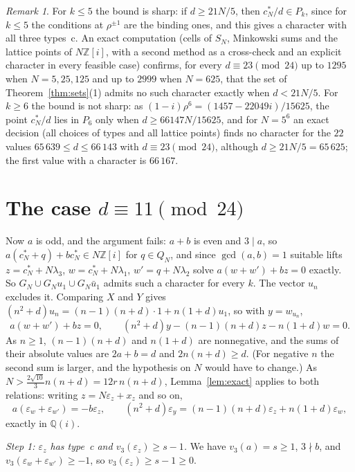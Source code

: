 \documentclass[11pt,a4paper]{amsart}
\theoremstyle{remark}
\newtheorem*{remark}{Remark}
\newcommand{\Q}{\mathbb{Q}}
\newcommand{\Z}{\mathbb{Z}}
\begin{document}
\begin{remark}
For $k\le5$ the bound is sharp: if $d\ge21N/5$, then $c^*_N/d\in P_k$, since for $k\le5$ the conditions at
$\rho^{\pm1}$ are the binding ones, and this gives a character with all three types~c. An exact computation (cells of
$S_N$, Minkowski sums and the lattice points of $N\Z[i]$, with a second method as a cross-check and an explicit
character in every feasible case) confirms, for every $d\equiv23\pmod{24}$ up to $1295$ when $N=5,25,125$ and up to
$2999$ when $N=625$, that the set of Theorem~\ref{thm:sets}(1) admits no such character exactly when $d<21N/5$. For
$k\ge6$ the bound is not sharp: as $(1-i)\rho^6=(1457-22049i)/15625$, the point $c^*_N/d$ lies in $P_6$ only when
$d\ge66147N/15625$, and for $N=5^6$ an exact decision (all choices of types and all lattice points) finds no
character for the $22$ values $65\,639\le d\le66\,143$ with $d\equiv23\pmod{24}$, although $d\ge21N/5=65\,625$; the
first value with a character is $66\,167$.
\end{remark}

\section{The case \texorpdfstring{$d\equiv11\pmod{24}$}{d = 11 mod 24}}\label{sec:11}

Now $a$ is odd, and the argument fails: $a+b$ is even and $3\mid a$, so $a(c^*_N+q)+bc^*_N\in N\Z[i]$ for $q\in Q_N$,
and since $\gcd(a,b)=1$ suitable lifts $z=c^*_N+N\lambda_3$, $w=c^*_N+N\lambda_1$, $w'=q+N\lambda_2$ solve
$a(w+w')+bz=0$ exactly. So $G_N\cup G_Nu_1\cup G_N\bar u_1$ admits such a character for every $k$. The vector $u_n$ excludes it. Comparing
$X$ and $Y$ gives $(n^2+d)u_n=(n-1)(n+d)\cdot1+n(1+d)u_1$, so with $y=w_{u_n}$,
\[
a(w+w')+bz=0,\qquad(n^2+d)y-(n-1)(n+d)z-n(1+d)w=0.
\]
As $n\ge1$, $(n-1)(n+d)$ and $n(1+d)$ are nonnegative, and the sums of their absolute values are $2a+b=d$ and
$2n(n+d)\ge d$. (For negative $n$ the second sum is larger, and the hypothesis on $N$ would have to change.) As
$N>\frac{2\sqrt{10}}3n(n+d)=12r\,n(n+d)$, Lemma~\ref{lem:exact} applies to both relations: writing
$z=N\varepsilon_z+x_z$ and so on,
\begin{equation}\label{eq:exact11}
a(\varepsilon_w+\varepsilon_{w'})=-b\varepsilon_z,\qquad
(n^2+d)\varepsilon_y=(n-1)(n+d)\varepsilon_z+n(1+d)\varepsilon_w,
\end{equation}
exactly in $\Q(i)$.

\emph{Step 1: $\varepsilon_z$ has type~c and $v_3(\varepsilon_z)\ge s-1$.} We have $v_3(a)=s\ge1$, $3\nmid b$, and
$v_3(\varepsilon_w+\varepsilon_{w'})\ge-1$, so $v_3(\varepsilon_z)\ge s-1\ge0$.
\end{document}
